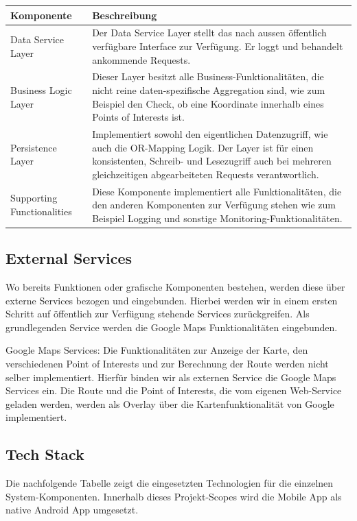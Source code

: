 \documentclass[a4paper,10pt,xetex]{article}
\begin{document}
\begin{longtabu} to \textwidth { | l | X[l] | }
\hline
\textbf{Komponente} & \textbf{Beschreibung} \\\hline
\endhead

Data Service Layer & Der Data Service Layer stellt das nach aussen öffentlich verfügbare
Interface zur Verfügung. Er loggt und behandelt ankommende
Requests.\\\hline

Business Logic Layer & Dieser Layer besitzt alle Business-Funktionalitäten, die nicht reine
daten-spezifische Aggregation sind, wie zum Beispiel den Check, ob eine
Koordinate innerhalb eines Points of Interests ist.\\\hline

Persistence Layer & Implementiert sowohl den eigentlichen Datenzugriff, wie auch die
OR-Mapping Logik. Der Layer ist für einen konsistenten, Schreib- und
Lesezugriff auch bei mehreren gleichzeitigen abgearbeiteten Requests
verantwortlich.\\\hline

Supporting Functionalities & Diese Komponente implementiert alle Funktionalitäten, die den anderen
Komponenten zur Verfügung stehen wie zum Beispiel Logging und sonstige
Monitoring-Funktionalitäten.\\\hline
\end{longtabu}


\subsection{External Services}\label{external-services}
Wo bereits Funktionen oder grafische
Komponenten bestehen, werden diese über externe Services bezogen und
eingebunden. Hierbei werden wir in einem ersten Schritt auf öffentlich
zur Verfügung stehende Services zurückgreifen. Als grundlegenden Service
werden die Google Maps Funktionalitäten eingebunden.

Google Maps Services: Die Funktionalitäten zur Anzeige der Karte, den
verschiedenen Point of Interests und zur Berechnung der Route werden
nicht selber implementiert. Hierfür binden wir als externen Service die
Google Maps Services ein. Die Route und die Point of Interests, die vom
eigenen Web-Service geladen werden, werden als Overlay über die
Kartenfunktionalität von Google implementiert.


\subsection{Tech Stack}\label{tech-stack}
Die nachfolgende Tabelle zeigt die eingesetzten Technologien für die
einzelnen System-Komponenten. Innerhalb dieses Projekt-Scopes wird die
Mobile App als native Android App umgesetzt.
\end{document}
